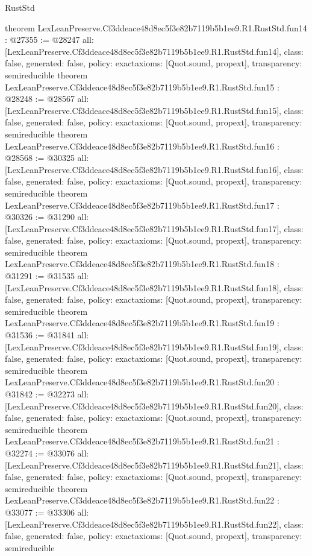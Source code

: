 \begin{lexlean}{RustStd}
\begin{coremodule}
{}
theorem LexLeanPreserve.Cf3ddeace48d8ec5f3e82b7119b5b1ee9.R1.RustStd.fun14 : @27355 := @28247 {
  all: [LexLeanPreserve.Cf3ddeace48d8ec5f3e82b7119b5b1ee9.R1.RustStd.fun14],
  class: false,
  generated: false,
  policy: exact{axioms: [Quot.sound, propext]},
  transparency: semireducible
}
theorem LexLeanPreserve.Cf3ddeace48d8ec5f3e82b7119b5b1ee9.R1.RustStd.fun15 : @28248 := @28567 {
  all: [LexLeanPreserve.Cf3ddeace48d8ec5f3e82b7119b5b1ee9.R1.RustStd.fun15],
  class: false,
  generated: false,
  policy: exact{axioms: [Quot.sound, propext]},
  transparency: semireducible
}
theorem LexLeanPreserve.Cf3ddeace48d8ec5f3e82b7119b5b1ee9.R1.RustStd.fun16 : @28568 := @30325 {
  all: [LexLeanPreserve.Cf3ddeace48d8ec5f3e82b7119b5b1ee9.R1.RustStd.fun16],
  class: false,
  generated: false,
  policy: exact{axioms: [Quot.sound, propext]},
  transparency: semireducible
}
theorem LexLeanPreserve.Cf3ddeace48d8ec5f3e82b7119b5b1ee9.R1.RustStd.fun17 : @30326 := @31290 {
  all: [LexLeanPreserve.Cf3ddeace48d8ec5f3e82b7119b5b1ee9.R1.RustStd.fun17],
  class: false,
  generated: false,
  policy: exact{axioms: [Quot.sound, propext]},
  transparency: semireducible
}
theorem LexLeanPreserve.Cf3ddeace48d8ec5f3e82b7119b5b1ee9.R1.RustStd.fun18 : @31291 := @31535 {
  all: [LexLeanPreserve.Cf3ddeace48d8ec5f3e82b7119b5b1ee9.R1.RustStd.fun18],
  class: false,
  generated: false,
  policy: exact{axioms: [Quot.sound, propext]},
  transparency: semireducible
}
theorem LexLeanPreserve.Cf3ddeace48d8ec5f3e82b7119b5b1ee9.R1.RustStd.fun19 : @31536 := @31841 {
  all: [LexLeanPreserve.Cf3ddeace48d8ec5f3e82b7119b5b1ee9.R1.RustStd.fun19],
  class: false,
  generated: false,
  policy: exact{axioms: [Quot.sound, propext]},
  transparency: semireducible
}
theorem LexLeanPreserve.Cf3ddeace48d8ec5f3e82b7119b5b1ee9.R1.RustStd.fun20 : @31842 := @32273 {
  all: [LexLeanPreserve.Cf3ddeace48d8ec5f3e82b7119b5b1ee9.R1.RustStd.fun20],
  class: false,
  generated: false,
  policy: exact{axioms: [Quot.sound, propext]},
  transparency: semireducible
}
theorem LexLeanPreserve.Cf3ddeace48d8ec5f3e82b7119b5b1ee9.R1.RustStd.fun21 : @32274 := @33076 {
  all: [LexLeanPreserve.Cf3ddeace48d8ec5f3e82b7119b5b1ee9.R1.RustStd.fun21],
  class: false,
  generated: false,
  policy: exact{axioms: [Quot.sound, propext]},
  transparency: semireducible
}
theorem LexLeanPreserve.Cf3ddeace48d8ec5f3e82b7119b5b1ee9.R1.RustStd.fun22 : @33077 := @33306 {
  all: [LexLeanPreserve.Cf3ddeace48d8ec5f3e82b7119b5b1ee9.R1.RustStd.fun22],
  class: false,
  generated: false,
  policy: exact{axioms: [Quot.sound, propext]},
  transparency: semireducible
}
\end{coremodule}
\end{lexlean}
